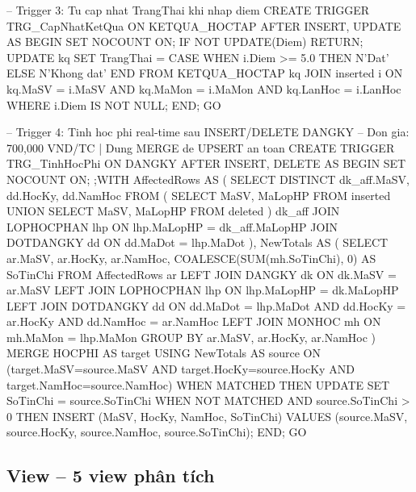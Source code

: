 \documentclass[13pt, a4paper]{article}
\begin{document}
\begin{sqlbox}
-- Trigger 3: Tu cap nhat TrangThai khi nhap diem
CREATE TRIGGER TRG_CapNhatKetQua ON KETQUA_HOCTAP AFTER INSERT, UPDATE
AS
BEGIN
    SET NOCOUNT ON;
    IF NOT UPDATE(Diem) RETURN;
    UPDATE kq
    SET TrangThai = CASE WHEN i.Diem >= 5.0 THEN N'Dat' ELSE N'Khong dat' END
    FROM KETQUA_HOCTAP kq
    JOIN inserted i ON kq.MaSV = i.MaSV AND kq.MaMon = i.MaMon
                    AND kq.LanHoc = i.LanHoc
    WHERE i.Diem IS NOT NULL;
END;
GO

-- Trigger 4: Tinh hoc phi real-time sau INSERT/DELETE DANGKY
-- Don gia: 700,000 VND/TC | Dung MERGE de UPSERT an toan
CREATE TRIGGER TRG_TinhHocPhi ON DANGKY AFTER INSERT, DELETE
AS
BEGIN
    SET NOCOUNT ON;
    ;WITH AffectedRows AS (
        SELECT DISTINCT dk_aff.MaSV, dd.HocKy, dd.NamHoc
        FROM (
            SELECT MaSV, MaLopHP FROM inserted
            UNION SELECT MaSV, MaLopHP FROM deleted
        ) dk_aff
        JOIN LOPHOCPHAN lhp ON lhp.MaLopHP = dk_aff.MaLopHP
        JOIN DOTDANGKY  dd  ON dd.MaDot    = lhp.MaDot
    ),
    NewTotals AS (
        SELECT ar.MaSV, ar.HocKy, ar.NamHoc,
               COALESCE(SUM(mh.SoTinChi), 0) AS SoTinChi
        FROM AffectedRows ar
        LEFT JOIN DANGKY     dk  ON dk.MaSV = ar.MaSV
        LEFT JOIN LOPHOCPHAN lhp ON lhp.MaLopHP = dk.MaLopHP
        LEFT JOIN DOTDANGKY  dd  ON dd.MaDot = lhp.MaDot
                                 AND dd.HocKy  = ar.HocKy
                                 AND dd.NamHoc = ar.NamHoc
        LEFT JOIN MONHOC     mh  ON mh.MaMon = lhp.MaMon
        GROUP BY ar.MaSV, ar.HocKy, ar.NamHoc
    )
    MERGE HOCPHI AS target
    USING NewTotals AS source
    ON (target.MaSV=source.MaSV AND target.HocKy=source.HocKy
        AND target.NamHoc=source.NamHoc)
    WHEN MATCHED THEN
        UPDATE SET SoTinChi = source.SoTinChi
    WHEN NOT MATCHED AND source.SoTinChi > 0 THEN
        INSERT (MaSV, HocKy, NamHoc, SoTinChi)
        VALUES (source.MaSV, source.HocKy, source.NamHoc, source.SoTinChi);
END;
GO
\end{sqlbox}

\subsection{View -- 5 view phân tích}
\end{document}
